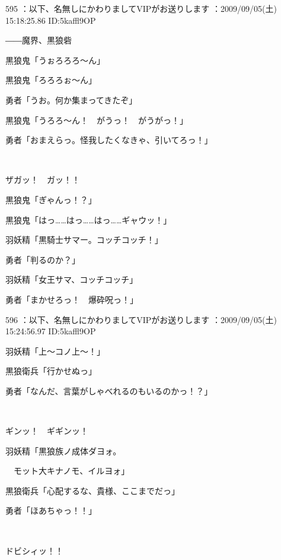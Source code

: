 \documentclass[a4j,twocolumn]{tarticle}
\begin{document}
    

595 ：以下、名無しにかわりましてVIPがお送りします ：2009/09/05(土) 15:18:25.86 ID:5kaffl9OP 


――魔界、黒狼砦 



黒狼鬼「うぉろろろ～ん」\par{} 
黒狼鬼「ろろろぉ～ん」 



勇者「うお。何か集まってきたぞ」 



黒狼鬼「うろろ～ん！　がうっ！　がうがっ！」\par{} 
勇者「おまえらっ。怪我したくなきゃ、引いてろっ！」 

　

ザガッ！　ガッ！！ 



黒狼鬼「ぎゃんっ！？」\par{} 
黒狼鬼「はっ……はっ……はっ……ギャウッ！」 



羽妖精「黒騎士サマー。コッチコッチ！」 \par{}
勇者「判るのか？」 



羽妖精「女王サマ、コッチコッチ」\par{} 
勇者「まかせろっ！　爆砕呪っ！」 

	
    
    

596 ：以下、名無しにかわりましてVIPがお送りします ：2009/09/05(土) 15:24:56.97 ID:5kaffl9OP 


羽妖精「上～コノ上～！」\par{} 
黒狼衛兵「行かせぬっ」  



勇者「なんだ、言葉がしゃべれるのもいるのかっ！？」  

　

ギンッ！　ギギンッ！  



羽妖精「黒狼族ノ成体ダヨォ。\par{} 
　モット大キナノモ、イルヨォ」  



黒狼衛兵「心配するな、貴様、ここまでだっ」  



勇者「ほあちゃっ！！」  

　

ドビシィッ！！  
\end{document}
